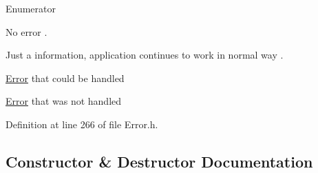 \begin{Desc}
\item[Enumerator]\par
\begin{description}
\item[{\em 
No\+Error\hypertarget{class_mdt_1_1_error_ab533dc690f68a8635232db594194a068a1f0076cc77af5bed268bcef0c88969de}{}\label{class_mdt_1_1_error_ab533dc690f68a8635232db594194a068a1f0076cc77af5bed268bcef0c88969de}
}]No error . \item[{\em 
Info\hypertarget{class_mdt_1_1_error_ab533dc690f68a8635232db594194a068a6cf5d2017767cf4086ebb2d245d42f11}{}\label{class_mdt_1_1_error_ab533dc690f68a8635232db594194a068a6cf5d2017767cf4086ebb2d245d42f11}
}]Just a information, application continues to work in normal way . \item[{\em 
Warning\hypertarget{class_mdt_1_1_error_ab533dc690f68a8635232db594194a068a6b9dbb52e31678b806f4ecf1ae23d2ab}{}\label{class_mdt_1_1_error_ab533dc690f68a8635232db594194a068a6b9dbb52e31678b806f4ecf1ae23d2ab}
}]\hyperlink{class_mdt_1_1_error}{Error} that could be handled \item[{\em 
Critical\hypertarget{class_mdt_1_1_error_ab533dc690f68a8635232db594194a068a6d4d123a2a43721c206c455a721567b6}{}\label{class_mdt_1_1_error_ab533dc690f68a8635232db594194a068a6d4d123a2a43721c206c455a721567b6}
}]\hyperlink{class_mdt_1_1_error}{Error} that was not handled \end{description}
\end{Desc}


Definition at line 266 of file Error.\+h.



\subsection{Constructor \& Destructor Documentation}
